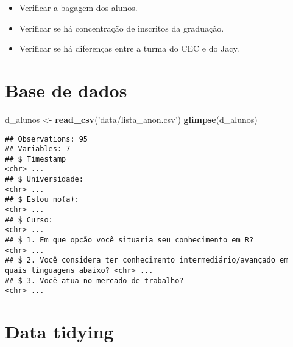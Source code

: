 \documentclass[]{book}
\newenvironment{Shaded}{\begin{snugshade}}{\end{snugshade}}
\newcommand{\KeywordTok}[1]{\textcolor[rgb]{0.13,0.29,0.53}{\textbf{{#1}}}}
\newcommand{\StringTok}[1]{\textcolor[rgb]{0.31,0.60,0.02}{{#1}}}
\newcommand{\NormalTok}[1]{{#1}}
\providecommand{\tightlist}{%
  \setlength{\itemsep}{0pt}\setlength{\parskip}{0pt}}
\begin{document}
\begin{itemize}
\tightlist
\item
  Verificar a bagagem dos alunos.
\item
  Verificar se há concentração de inscritos da graduação.
\item
  Verificar se há diferenças entre a turma do CEC e do Jacy.
\end{itemize}

\section{Base de dados}\label{base-de-dados}

\begin{Shaded}
\begin{Highlighting}[]
\NormalTok{d_alunos <-}\StringTok{ }\KeywordTok{read_csv}\NormalTok{(}\StringTok{'data/lista_anon.csv'}\NormalTok{)}
\KeywordTok{glimpse}\NormalTok{(d_alunos)}
\end{Highlighting}
\end{Shaded}

\begin{verbatim}
## Observations: 95
## Variables: 7
## $ Timestamp                                                                             <chr> ...
## $ Universidade:                                                                         <chr> ...
## $ Estou no(a):                                                                          <chr> ...
## $ Curso:                                                                                <chr> ...
## $ 1. Em que opção você situaria seu conhecimento em R?                                  <chr> ...
## $ 2. Você considera ter conhecimento intermediário/avançado em quais linguagens abaixo? <chr> ...
## $ 3. Você atua no mercado de trabalho?                                                  <chr> ...
\end{verbatim}

\section{Data tidying}\label{data-tidying}
\end{document}
